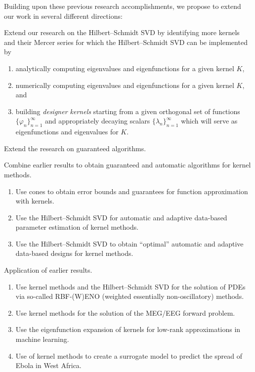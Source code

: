 \documentclass[11pt]{NSFamsart}
\begin{document}
Building upon these previous research accomplishments, we propose to extend our work in several different directions:

\begin{description}[leftmargin=2.5ex]

\item[Research Project 1] Extend our research on the Hilbert--Schmidt SVD by identifying more kernels and their Mercer series for which the Hilbert--Schmidt SVD can be implemented by
\begin{enumerate}
\renewcommand{\labelenumi}{1.\arabic{enumi}.}
\item analytically computing eigenvalues and eigenfunctions for a given kernel $K$,
\item numerically computing eigenvalues and eigenfunctions for a given kernel $K$, and
\item building \emph{designer kernels} starting from a given orthogonal set of functions $\{\varphi_n\}_{n=1}^\infty$ and appropriately decaying scalars $\{\lambda_n\}_{n=1}^\infty$ which will serve as eigenfunctions and eigenvalues for $K$.
\end{enumerate}

\item[Research Project 2] Extend the research on guaranteed algorithms.

\item[Research Project 3] Combine earlier results to obtain guaranteed and automatic algorithms for kernel methods.
\begin{enumerate}
\item Use cones to obtain error bounds and guarantees for function approximation with kernels.
\item Use the Hilbert--Schmidt SVD for automatic and adaptive data-based parameter estimation of kernel methods.
\item Use the Hilbert--Schmidt SVD to obtain ``optimal'' automatic and adaptive data-based designs for kernel methods.
\end{enumerate}

\item[Research Project 4] Application of earlier results.
\begin{enumerate}
\item Use kernel methods and the Hilbert--Schmidt SVD for the solution of PDEs via so-called RBF-(W)ENO (weighted essentially non-oscillatory) methods.
\item Use kernel methods for the solution of the MEG/EEG forward problem.
\item Use the eigenfunction expansion of kernels for low-rank approximations in machine learning.
\item Use of kernel methods to create a surrogate model to predict the spread of Ebola in West Africa.
\end{enumerate}

\end{description}
\end{document}
